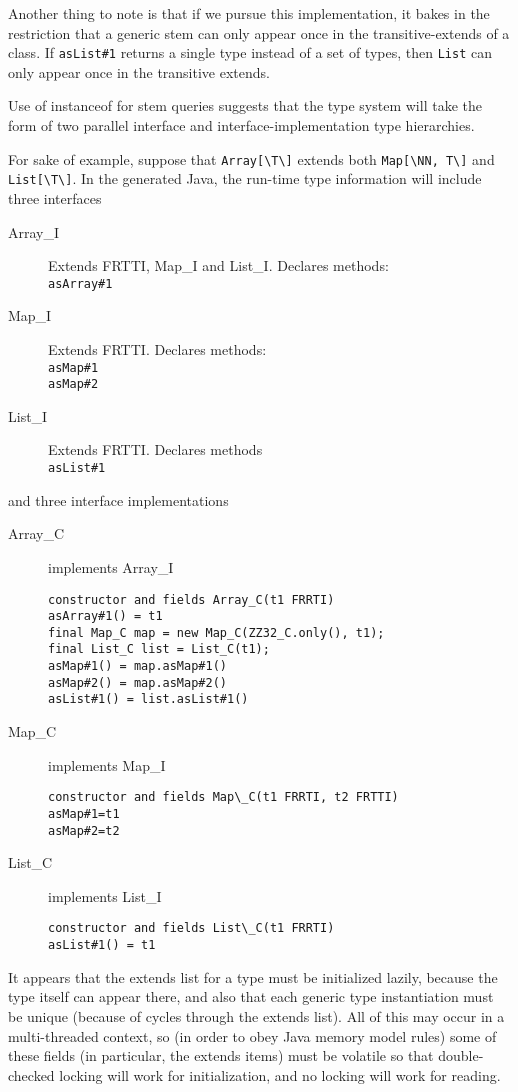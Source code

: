 \documentclass[11pt]{article}
\begin{document}
Another thing to note is that if we pursue this implementation, it bakes in the restriction that a generic stem can only appear once in the transitive-extends of a class.  If \verb+asList#1+ returns a single type instead of a set of types, then \verb+List+ can only appear once in the transitive extends.

Use of instanceof for stem queries suggests that the type system will take the form of two parallel interface and interface-implementation type hierarchies.

For sake of example, suppose that \verb+Array[\T\]+ extends both \verb+Map[\NN, T\]+ and \verb+List[\T\]+.  In the generated Java, the run-time type information will include three interfaces
\begin{description}
\item[Array\_I] Extends FRTTI, Map\_I and List\_I. Declares methods:\\
\verb+asArray#1+
\item[Map\_I] Extends FRTTI.  Declares methods:\\
\verb+asMap#1+\\
\verb+asMap#2+
\item[List\_I] Extends FRTTI.  Declares methods\\
\verb+asList#1+
\end{description}

and three interface implementations
\begin{description}
\item[Array\_C] implements Array\_I
\begin{verbatim}
constructor and fields Array_C(t1 FRRTI)
asArray#1() = t1
final Map_C map = new Map_C(ZZ32_C.only(), t1);
final List_C list = List_C(t1);
asMap#1() = map.asMap#1()
asMap#2() = map.asMap#2()
asList#1() = list.asList#1()
\end{verbatim}
\item[Map\_C] implements Map\_I
\begin{verbatim}
constructor and fields Map\_C(t1 FRRTI, t2 FRTTI)
asMap#1=t1
asMap#2=t2
\end{verbatim}
\item[List\_C] implements List\_I
\begin{verbatim}
constructor and fields List\_C(t1 FRRTI)
asList#1() = t1
\end{verbatim}
\end{description}

It appears that the extends list for a type must be initialized lazily, because the type itself can appear there, and also that each generic type instantiation must be unique (because of cycles through the extends list).  All of this may occur in a multi-threaded context, so (in order to obey Java memory model rules) some of these fields (in particular, the extends items) must be volatile so that double-checked locking will work for initialization, and no locking will work for reading.
\end{document}
